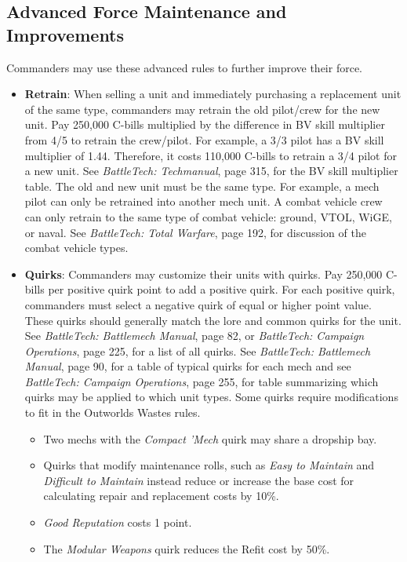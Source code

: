 \documentclass[UTF8]{article}
\begin{document}
\newpage

\subsection{Advanced Force Maintenance and Improvements}

Commanders may use these advanced rules to further improve their force.

\begin{itemize}

\item {\bf Retrain}: When selling a unit and immediately purchasing a replacement unit of the same type, commanders may retrain the old pilot/crew for the new unit.
Pay 250,000 C-bills multiplied by the difference in BV skill multiplier from 4/5 to retrain the crew/pilot.
For example, a 3/3 pilot has a BV skill multiplier of 1.44.
Therefore, it costs 110,000 C-bills to retrain a 3/4 pilot for a new unit.
See \emph{BattleTech: Techmanual}, page 315, for the BV skill multiplier table.
The old and new unit must be the same type.
For example, a mech pilot can only be retrained into another mech unit.
A combat vehicle crew can only retrain to the same type of combat vehicle: ground, VTOL, WiGE, or naval.
See \emph{BattleTech: Total Warfare}, page 192, for discussion of the combat vehicle types.

\item {\bf Quirks}: Commanders may customize their units with quirks.
Pay 250,000 C-bills per positive quirk point to add a positive quirk.
For each positive quirk, commanders must select a negative quirk of equal or higher point value.
These quirks should generally match the lore and common quirks for the unit.
See \emph{BattleTech: Battlemech Manual}, page 82, or \emph{BattleTech: Campaign Operations}, page 225, for a list of all quirks.
See \emph{BattleTech: Battlemech Manual}, page 90, for a table of typical quirks for each mech and see \emph{BattleTech: Campaign Operations}, page 255, for table summarizing which quirks may be applied to which unit types.
Some quirks require modifications to fit in the Outworlds Wastes rules.

\begin{itemize}

\item Two mechs with the \emph{Compact 'Mech} quirk may share a dropship bay.

\item Quirks that modify maintenance rolls, such as \emph{Easy to Maintain} and \emph{Difficult to Maintain} instead reduce or increase the base cost for calculating repair and replacement costs by 10\%.

\item \emph{Good Reputation} costs 1 point.

\item The \emph{Modular Weapons} quirk reduces the Refit cost by 50\%.

\end{itemize}

\end{itemize}
\end{document}
